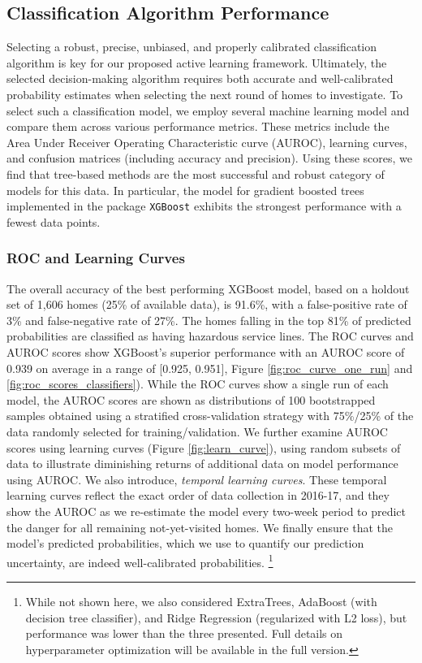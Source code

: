 \documentclass[sigconf]{acmart}
\begin{document}
\subsection{Classification Algorithm Performance}
\label{sec:empirical_prediction}

Selecting a robust, precise, unbiased, and properly calibrated classification algorithm is key for our proposed active learning framework. Ultimately, the selected decision-making algorithm requires both accurate and well-calibrated probability estimates when selecting the next round of homes to investigate. To select such a classification model, we employ several machine learning model and compare them across various performance metrics. These metrics include the Area Under Receiver Operating Characteristic curve (AUROC), learning curves, and confusion matrices (including accuracy and precision). Using these scores, we find that tree-based methods are the most successful and robust category of models for this data. In particular, the model for gradient boosted trees implemented in the package \texttt{XGBoost} exhibits the strongest performance with a fewest data points.

\subsubsection{ROC and Learning Curves}

The overall accuracy of the best performing XGBoost model, based on a holdout set of 1,606 homes (25\% of available data), is 91.6\%, with a false-positive rate of 3\% and false-negative rate of 27\%. The homes falling in the top 81\% of predicted probabilities are classified as having hazardous service lines. The ROC curves and AUROC scores show XGBoost's superior performance with an AUROC score of 0.939 on average in a range of [0.925, 0.951], Figure \ref{fig:roc_curve_one_run} and \ref{fig:roc_scores_classifiers}). While the ROC curves show a single run of each model, the AUROC scores are shown as distributions of 100 bootstrapped samples obtained using a stratified cross-validation strategy with 75\%/25\% of the data randomly selected for training/validation. We further examine AUROC scores using learning curves (Figure \ref{fig:learn_curve}), using random subsets of data to illustrate diminishing returns of additional data on model performance using AUROC.  We also introduce, \emph{temporal learning curves}. These temporal learning curves reflect the exact order of data collection in 2016-17, and they show the AUROC as we re-estimate the model every two-week period to predict the danger for all remaining not-yet-visited homes. We finally ensure that the model's predicted probabilities, which we use to quantify our prediction uncertainty, are indeed well-calibrated probabilities. \footnote{While not shown here, we also considered ExtraTrees, AdaBoost (with decision tree classifier), and Ridge Regression (regularized with L2 loss), but performance was lower than the three presented. Full details on hyperparameter optimization will be available in the full version.}
\end{document}
